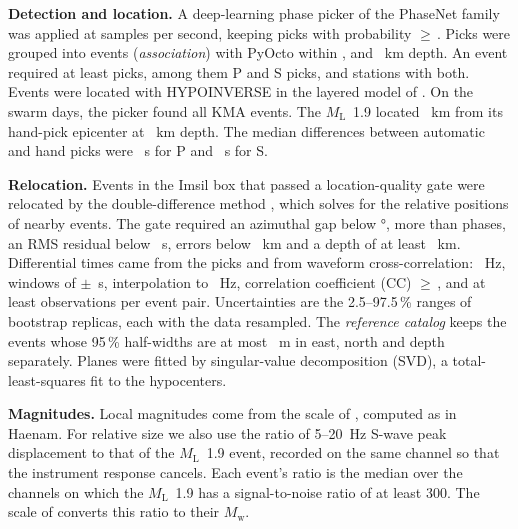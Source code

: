 \documentclass[11pt,a4paper]{article}
\newcommand{\Mw}{\ensuremath{M_\mathrm{w}}}
\newcommand{\ML}{\ensuremath{M_\mathrm{L}}}
\begin{document}
\textbf{Detection and location.} A deep-learning phase picker of the PhaseNet family \citep{Zhu2019} was applied at  samples per second, keeping picks with probability $\ge$\,. Picks were grouped into events (\emph{association}) with PyOcto \citep{Munchmeyer2024} within ,  and ~km depth. An event required at least  picks, among them  P and  S picks, and  stations with both. Events were located with HYPOINVERSE \citep{Klein2002} in the layered model of \citet{KimKim1983}. On the swarm days, the picker found all  KMA events. The \ML\ 1.9 located ~km from its hand-pick epicenter at ~km depth. The median differences between automatic and hand picks were ~s for P and ~s for S.

\textbf{Relocation.} Events in the Imsil box that passed a location-quality gate were relocated by the double-difference method \citep{Waldhauser2000}, which solves for the relative positions of nearby events. The gate required an azimuthal gap below °, more than  phases, an RMS residual below ~s, errors below ~km and a depth of at least ~km. Differential times came from the picks and from waveform cross-correlation: ~Hz, windows of $\pm$~s, interpolation to ~Hz, correlation coefficient (CC) $\ge$\,, and at least  observations per event pair. Uncertainties are the 2.5--97.5\,\% ranges of  bootstrap replicas, each with the data resampled. The \emph{reference catalog} keeps the events whose 95\,\% half-widths are at most ~m in east, north and depth separately. Planes were fitted by singular-value decomposition (SVD), a total-least-squares fit to the hypocenters.

\textbf{Magnitudes.} Local magnitudes come from the scale of \citet{Sheen2018}, computed as in Haenam. For relative size we also use the ratio of 5--20~Hz S-wave peak displacement to that of the \ML\ 1.9 event, recorded on the same channel so that the instrument response cancels. Each event's ratio is the median over the channels on which the \ML\ 1.9 has a signal-to-noise ratio of at least 300. The scale of \citet{Park2026} converts this ratio to their \Mw.
\end{document}
